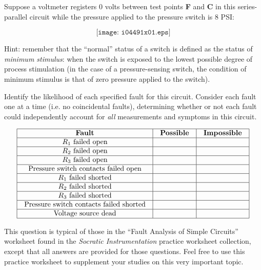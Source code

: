 

Suppose a voltmeter registers 0 volts between test points {\bf F} and {\bf C} in this series-parallel circuit while the pressure applied to the pressure switch is 8 PSI:

$$\texttt{[image: i04491x01.eps]}$$

Hint: remember that the ``normal'' status of a switch is defined as the status of {\it minimum stimulus}: when the switch is exposed to the lowest possible degree of process stimulation (in the case of a pressure-sensing switch, the condition of minimum stimulus is that of zero pressure applied to the switch).

\vskip 10pt

Identify the likelihood of each specified fault for this circuit.  Consider each fault one at a time (i.e. no coincidental faults), determining whether or not each fault could independently account for {\it all} measurements and symptoms in this circuit.


$$\vbox{\offinterlineskip
\halign{\strut
\vrule \quad\hfil # \ \hfil & 
\vrule \quad\hfil # \ \hfil & 
\vrule \quad\hfil # \ \hfil \vrule \cr
\noalign{\hrule}
%
{\bf Fault} & {\bf Possible} & {\bf Impossible} \cr
%
\noalign{\hrule}
%
$R_1$ failed open &  &  \cr
%
\noalign{\hrule}
%
$R_2$ failed open &  &  \cr
%
\noalign{\hrule}
%
$R_3$ failed open &  &  \cr
%
\noalign{\hrule}
%
Pressure switch contacts failed open &  &  \cr
%
\noalign{\hrule}
%
$R_1$ failed shorted &  &  \cr
%
\noalign{\hrule}
%
$R_2$ failed shorted &  &  \cr
%
\noalign{\hrule}
%
$R_3$ failed shorted &  &  \cr
%
\noalign{\hrule}
%
Pressure switch contacts failed shorted &  &  \cr
%
\noalign{\hrule}
%
Voltage source dead &  &  \cr
%
\noalign{\hrule}
} %
}$$ %

\vskip 10pt

This question is typical of those in the ``Fault Analysis of Simple Circuits'' worksheet found in the {\it Socratic Instrumentation} practice worksheet collection, except that all answers are provided for those questions.  Feel free to use this practice worksheet to supplement your studies on this very important topic.

